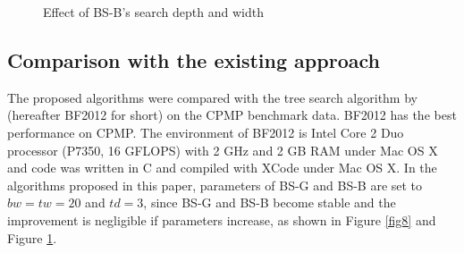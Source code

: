 \documentclass[review,3p,times,authoryear,12pt]{elsarticle}
\begin{document}
\begin{figure}[!htb]
\caption{Effect of BS-B's search depth and width}
\label{fig9}
\end{figure}

\subsection {Comparison with the existing approach}

The proposed algorithms were compared with the tree search algorithm by \cite{BF2012} (hereafter BF2012 for short) on the CPMP benchmark data. 
BF2012 has the best performance on CPMP. 
The environment of BF2012 is Intel Core 2 Duo processor (P7350, 16 GFLOPS) with 2 GHz and 2 GB RAM under Mac OS X and code was written in C and compiled with XCode under Mac OS X. 
In the algorithms proposed in this paper, parameters of BS-G and BS-B are set to $\mathit{bw}=\mathit{tw}=20$ and $\mathit{td}=3$, since BS-G and BS-B become stable and the improvement is negligible if parameters increase, as shown in Figure \ref{fig8} and Figure \ref{fig9}. 
\end{document}
